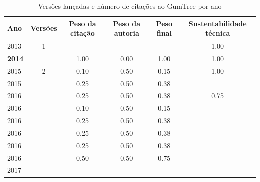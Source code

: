 \begin{table}[H]
\caption{Versões lançadas e número de citações ao GumTree por ano}
\centering
\begin{tabular}{| l | c | c | c | c | c |}
  \hline
  Ano & Versões & Peso da citação & Peso da autoria & Peso final & Sustentabilidade técnica \\
  \hline
        2013 & 1 & - & - & -
        &
          {\color{blue} 1.00}
        \\
\hline
            {\bf 2014}
          &
          
          &
          1.00
          &
          0.00
          &
          1.00
          &
            {\color{blue} 1.00}
          \\
\hline
            2015
          &
          2
          &
          0.10
          &
          0.50
          &
          0.15
          &
            {\color{blue} 1.00}
          \\
            2015
          &
          
          &
          0.25
          &
          0.50
          &
          0.38
          &
          \\
\hline
            2016
          &
          
          &
          0.25
          &
          0.50
          &
          0.38
          &
            {\color{blue} 0.75}
          \\
            2016
          &
          
          &
          0.10
          &
          0.50
          &
          0.15
          &
          \\
            2016
          &
          
          &
          0.25
          &
          0.50
          &
          0.38
          &
          \\
            2016
          &
          
          &
          0.25
          &
          0.50
          &
          0.38
          &
          \\
            2016
          &
          
          &
          0.25
          &
          0.50
          &
          0.38
          &
          \\
            2016
          &
          
          &
          0.50
          &
          0.50
          &
          0.75
          &
          \\
\hline
            2017
          &
          

\end{tabular}
\end{table}
